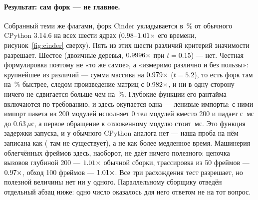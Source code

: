 \paragraph{Результат: сам форк --- не главное.}
Собранный теми же флагами, форк Cinder укладывается в \,\% от обычного CPython 3.14.6 на всех
шести ядрах ($0.98$--$\meas{ratio:b6_cinderx-fork:mandelbrot/fork|b6_cinderx-stock:mandelbrot/stock}{1.01}\times$ его времени, рисунок~\ref{fig:cinder} сверху). Пять из этих
шести различий критерий значимости разрешает. Шестое (двоичные деревья, $\meas{ratio:b6_cinderx-fork:binarytrees/fork|b6_cinderx-stock:binarytrees/stock}{0.9996}\times$ при
$t=0.15$) --- нет. Честная формулировка поэтому не «то же
самое», а «измеримо различно и без пользы»: крупнейшее из различий --- сумма массива на
$\meas{ratio:b6_cinderx-fork:arraysum/fork|b6_cinderx-stock:arraysum/stock}{0.979}\times$ ($t=5.2$), то есть форк там на \,\% быстрее, следом произведение матриц с
$\meas{ratio:b6_cinderx-fork:matmul/fork|b6_cinderx-stock:matmul/stock}{0.982}\times$, и ни в одну сторону ничего не сдвигается больше чем на \,\%. Глубокие функции его рантайма включаются по требованию, и здесь
окупается одна --- ленивые импорты: с ними импорт пакета из 200 модулей исполняет 0 тел модулей
вместо 200 и падает с \,мс до 0.63\,$\mu$с, а первое обращение к отложенному модулю стоит
\,мс. Это функция задержки запуска, и у обычного CPython аналога нет --- наша проба на нём
записана как  ( там не существует), а не как
более медленное время. Машинерия облегчённых фреймов здесь, наоборот, не даёт ничего полезного:
цепочка вызовов глубиной 200 --- $\meas{ratio:b6_cinderx-fork:call_depth_200/fork|b6_cinderx-stock:call_depth_200/stock}{1.01}\times$ обычной сборки, трассировка из 50 фреймов ---
$\meas{ratio:b6_cinderx-fork:traceback_depth_50/fork|b6_cinderx-stock:traceback_depth_50/stock}{0.97}\times$, обход 100 фреймов --- $\meas{ratio:b6_cinderx-fork:frame_walk_depth_100/fork|b6_cinderx-stock:frame_walk_depth_100/stock}{1.01}\times$. Все три расхождения тест разрешает, но
полезной величины нет ни у одного.
Параллельному сборщику отведён отдельный абзац ниже: одно число оказалось для него
ответом не на тот вопрос.

